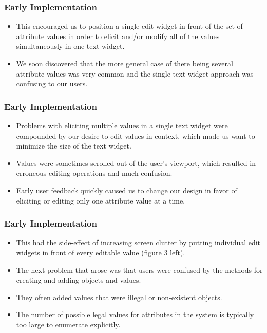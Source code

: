 \documentclass{beamer}
\begin{document}
\begin{frame}
\frametitle{Early Implementation}

\begin{itemize}
\item This encouraged us to position a single edit widget in front of the set of attribute values in order to elicit and/or modify all of the values simultaneously in one text widget.
\item We soon discovered that the more general case of there being several attribute values was very common and the single text widget approach was confusing to our users.
\end{itemize}

\end{frame}

\begin{frame}
\frametitle{Early Implementation}

\begin{itemize}
\item Problems with eliciting multiple values in a single text widget were compounded by our desire to edit values in context, which made us want to minimize the size of the text widget.
\item Values were sometimes scrolled out of the user's viewport, which resulted in erroneous editing operations and much confusion.
\item Early user feedback quickly caused us to change our design in favor of eliciting or editing only one attribute value at a time.
\end{itemize}

\end{frame}

\begin{frame}
\frametitle{Early Implementation}

\begin{itemize}
\item This had the side-effect of increasing screen clutter by putting individual edit widgets in front of every editable value (figure 3 left).
\item The next problem that arose was that users were confused by the methods for creating and adding objects and values.
\item They often added values that were illegal or non-existent objects.
\item The number of possible legal values for attributes in the system is typically too large to enumerate explicitly.
\end{itemize}

\end{frame}
\end{document}
